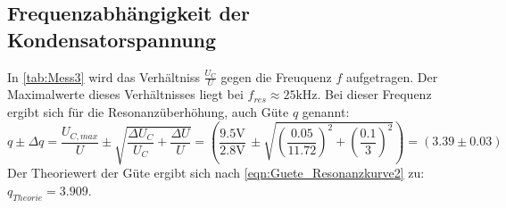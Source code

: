 \subsection{Frequenzabhängigkeit der Kondensatorspannung}
\label{subsec:AuswertungC}
In \autoref{tab:Mess3} wird das Verhältniss $\frac{U_C}{U}$ gegen die Freuquenz $f$ aufgetragen. Der Maximalwerte dieses Verhältnisses liegt bei $f_{res} \approx 25 \unit{\kilo\hertz}$.
Bei dieser Frequenz ergibt sich für die Resonanzüberhöhung, auch Güte $q$ genannt:
\begin{equation}
  q \pm \Delta q = \frac{U_{C,max}}{U} \pm \sqrt{\frac{\Delta U_{C}}{U_{C}} + \frac{\Delta U}{U}}
  = \left(\frac{9.5\unit{\volt}}{2.8\unit{\volt}} \, \pm \sqrt{\left(\frac{0.05}{11.72}\right)^2 + \left(\frac{0.1}{3}\right)^2}\right)
  = \left(3.39 \pm 0.03\right)
\end{equation}
Der Theoriewert der Güte ergibt sich nach \eqref{eqn:Guete_Resonanzkurve2} zu: $q_{Theorie} = 3.909$.

